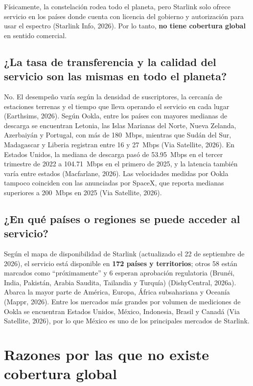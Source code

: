 \documentclass[12pt,letterpaper]{article}
\begin{document}
Físicamente, la constelación rodea todo el planeta, pero Starlink solo ofrece servicio en los países donde cuenta con licencia del gobierno y autorización para usar el espectro (Starlink Info, 2026). Por lo tanto, \textbf{no tiene cobertura global} en sentido comercial.

\subsection{¿La tasa de transferencia y la calidad del servicio son las mismas en todo el planeta?}

No. El desempeño varía según la densidad de suscriptores, la cercanía de estaciones terrenas y el tiempo que lleva operando el servicio en cada lugar (Earthsims, 2026). Según Ookla, entre los países con mayores medianas de descarga se encuentran Letonia, las Islas Marianas del Norte, Nueva Zelanda, Azerbaiyán y Portugal, con más de 180~Mbps, mientras que Sudán del Sur, Madagascar y Liberia registran entre 16 y 27~Mbps (Via Satellite, 2026). En Estados Unidos, la mediana de descarga pasó de 53.95~Mbps en el tercer trimestre de 2022 a 104.71~Mbps en el primero de 2025, y la latencia también varía entre estados (Macfarlane, 2026). Las velocidades medidas por Ookla tampoco coinciden con las anunciadas por SpaceX, que reporta medianas superiores a 200~Mbps en 2025 (Via Satellite, 2026).

\subsection{¿En qué países o regiones se puede acceder al servicio?}

Según el mapa de disponibilidad de Starlink (actualizado el 22 de septiembre de 2026), el servicio está disponible en \textbf{172 países y territorios}; otros 58 están marcados como ``próximamente'' y 6 esperan aprobación regulatoria (Brunéi, India, Pakistán, Arabia Saudita, Tailandia y Turquía) (DishyCentral, 2026a). Abarca la mayor parte de América, Europa, África subsahariana y Oceanía (Mappr, 2026). Entre los mercados más grandes por volumen de mediciones de Ookla se encuentran Estados Unidos, México, Indonesia, Brasil y Canadá (Via Satellite, 2026), por lo que México es uno de los principales mercados de Starlink.

\section{Razones por las que no existe cobertura global}
\end{document}
